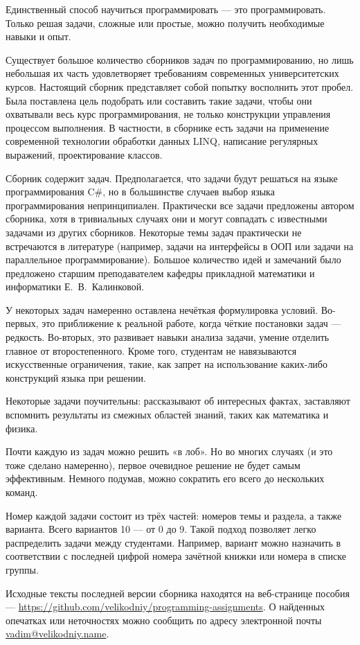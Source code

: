 
Единственный способ научиться программировать — это
программировать. Только решая задачи, сложные или простые, можно
получить необходимые навыки и опыт.

Существует большое количество сборников задач по программированию, но
лишь небольшая их часть удовлетворяет требованиям современных
университетских курсов. Настоящий сборник представляет собой попытку
восполнить этот пробел. Была поставлена цель подобрать или составить
такие задачи, чтобы они охватывали весь курс программирования, не
только конструкции управления процессом выполнения. В частности, в
сборнике есть задачи на применение современной технологии обработки
данных LINQ, написание регулярных выражений, проектирование классов.

Сборник содержит  задач. Предполагается, что задачи
будут решаться на языке программирования C\#, но в большинстве случаев
выбор языка программирования непринципиален. Практически все задачи
предложены автором сборника, хотя в тривиальных случаях они и могут
совпадать с известными задачами из других сборников. Некоторые темы
задач практически не встречаются в литературе (например, задачи на
интерфейсы в ООП или задачи на параллельное программирование). Большое
количество идей и замечаний было предложено старшим преподавателем
кафедры прикладной математики и информатики Е.~В.~Калинковой.

У некоторых задач намеренно оставлена нечёткая формулировка
условий. Во-первых, это приближение к реальной работе, когда чёткие
постановки задач — редкость. Во-вторых, это развивает навыки анализа
задачи, умение отделить главное от второстепенного. Кроме того,
студентам не навязываются искусственные ограничения, такие, как запрет
на использование каких-либо конструкций языка при решении.

Некоторые задачи поучительны: рассказывают об интересных фактах,
заставляют вспомнить результаты из смежных областей знаний, таких как
математика и физика.

Почти каждую из задач можно решить «в лоб». Но во многих случаях (и
это тоже сделано намеренно), первое очевидное решение не будет самым
эффективным. Немного подумав, можно сократить его всего до нескольких
команд.

Номер каждой задачи состоит из трёх частей: номеров темы и раздела, а
также варианта. Всего вариантов 10 — от 0 до 9. Такой подход позволяет
легко распределить задачи между студентами. Например, вариант можно
назначить в соответствии с последней цифрой номера зачётной книжки или
номера в списке группы.




Исходные тексты последней версии сборника находятся на веб-странице
пособия —
\url{https://github.com/velikodniy/programming-assignments}. О найденных
опечатках или неточностях можно сообщить по адресу электронной почты
\href{mailto:vadim@velikodniy.name}{vadim@velikodniy.name}.
